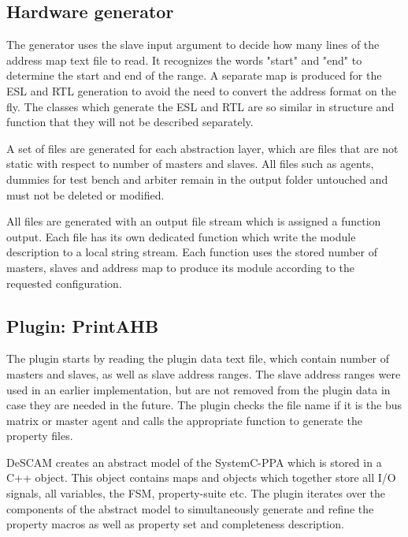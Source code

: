 \subsection{Hardware generator}
The generator uses the slave input argument to decide how many lines of the address map text file to read. It recognizes the words "start" and "end" to determine the start and end of the range. A separate map is produced for the ESL and RTL generation to avoid the need to convert the address format on the fly. The classes which generate the ESL and RTL are so similar in structure and function that they will not be described separately. \par
A set of files are generated for each abstraction layer, which are files that are not static with respect to number of masters and slaves. All files such as agents, dummies for test bench and arbiter remain in the output folder untouched and must not be deleted or modified. \par
All files are generated with an output file stream which is assigned a function output. Each file has its own dedicated function which write the module description to a local string stream. Each function uses the stored number of masters, slaves and address map to produce its module according to the requested configuration. 

\subsection{Plugin: PrintAHB}
The plugin starts by reading the plugin data text file, which contain number of masters and slaves, as well as slave address ranges. The slave address ranges were used in an earlier implementation, but are not removed from the plugin data in case they are needed in the future. The plugin checks the file name if it is the bus matrix or master agent and calls the appropriate function to generate the property files. \par
DeSCAM creates an abstract model of the SystemC-PPA which is stored in a C++ object. This object contains maps and objects which together store all I/O signals, all variables, the FSM, property-suite etc. The plugin iterates over the components of the abstract model to simultaneously generate and refine the property macros as well as property set and completeness description.

